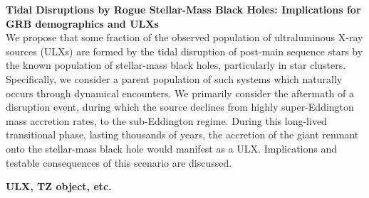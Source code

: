 {\bf Tidal Disruptions by Rogue Stellar-Mass Black Holes:  Implications for GRB demographics and ULXs}\\

We propose that some fraction of the observed population of ultraluminous X-ray sources (ULXs) are formed by the tidal 
disruption of post-main sequence stars by the known population of stellar-mass black holes, particularly in star clusters.  Specifically, we consider a parent population of such systems which naturally occurs through dynamical encounters.  We primarily consider the aftermath of a disruption event, during which the source declines from highly super-Eddington mass accretion rates, to the sub-Eddington regime.  During this long-lived transitional phase, lasting thousands of years, the accretion of the giant remnant onto the stellar-mass black hole would manifest as a ULX.   Implications and testable consequences of this scenario are discussed.



{\bf ULX, TZ object, etc.}

